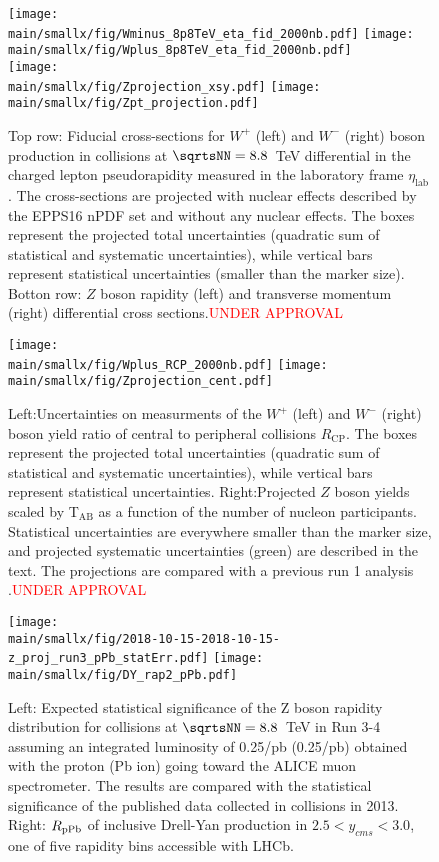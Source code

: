 \documentclass[../report.tex]{subfiles}
\providecommand{\main}{..}
\begin{document}
\begin{figure}
\centering
\texttt{[image: \\main/smallx/fig/Wminus\_8p8TeV\_eta\_fid\_2000nb.pdf]}
\texttt{[image: \\main/smallx/fig/Wplus\_8p8TeV\_eta\_fid\_2000nb.pdf]}\\
\texttt{[image: \\main/smallx/fig/Zprojection\_xsy.pdf]}
\texttt{[image: \\main/smallx/fig/Zpt\_projection.pdf]}
\caption{Top row: Fiducial cross-sections for $W^+$ (left) and $W^-$ (right) boson production in \pPb collisions at $\sqrtsNN=8.8$~TeV differential in the charged lepton pseudorapidity measured in the laboratory frame $\eta_{\mathrm{lab}}$. The cross-sections are projected with nuclear effects described by the EPPS16 nPDF set and without any nuclear effects. The boxes represent the projected total uncertainties (quadratic sum of statistical and systematic uncertainties), while vertical bars represent statistical uncertainties (smaller than the marker size).
Botton row: $Z$ boson rapidity (left) and transverse momentum (right) differential cross sections.\textcolor{red}{UNDER APPROVAL}}
\label{fig:ATLASWZxsection}
\texttt{[image: \\main/smallx/fig/Wplus\_RCP\_2000nb.pdf]}
\texttt{[image: \\main/smallx/fig/Zprojection\_cent.pdf]}
\caption{Left:Uncertainties on measurments of the $W^+$ (left) and $W^-$ (right) boson yield ratio of central to peripheral collisions $R_{\mathrm{CP}}$.  The boxes represent the projected total uncertainties (quadratic sum of statistical and systematic uncertainties), while vertical bars represent statistical uncertainties.  Right:Projected $Z$ boson yields scaled by T$_{\mathrm{AB}}$ as a function of the number of nucleon participants.  Statistical uncertainties are everywhere smaller than the marker size, and projected systematic uncertainties (green) are described in the text.  The projections are compared with a previous run 1 analysis  \cite{Aad:2015gta}.\textcolor{red}{UNDER APPROVAL}}
\label{fig:ATLASWZcent} 
\end{figure}


\begin{figure}[htb]
\centering
\texttt{[image: \\main/smallx/fig/2018-10-15-2018-10-15-z\_proj\_run3\_pPb\_statErr.pdf]}
\texttt{[image: \\main/smallx/fig/DY\_rap2\_pPb.pdf]}
\caption{Left: Expected statistical significance of the Z boson rapidity distribution for \pPb collisions at $\sqrtsNN = 8.8$~TeV in Run 3-4 assuming an integrated luminosity of 0.25/pb (0.25/pb) obtained with the proton (Pb ion) going toward the ALICE muon spectrometer. %
The results are compared with the statistical significance of the published data collected in \pPb collisions in 2013. Right: $R_{\rm pPb}$ of inclusive Drell-Yan production in $2.5<y_{cms}<3.0$, one of five rapidity bins accessible with LHCb.  %
}
\label{fig:plotDY}
\end{figure}
\end{document}

